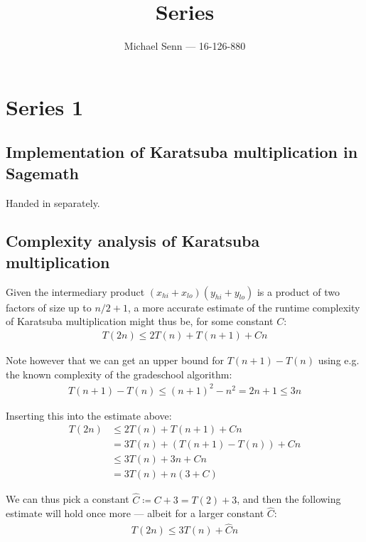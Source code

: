 \documentclass[a4paper]{scrreprt}
\title{Series \series}
\author{Michael Senn \maillink{michael.senn@students.unibe.ch} --- 16-126-880}
\date{\printdate}
\newcommand{\series}{1}
\begin{document}
\maketitle


\setcounter{chapter}{\numexpr \series - 1 \relax}

\chapter{Series \series}

\section{Implementation of Karatsuba multiplication in Sagemath}

Handed in separately.

\section{Complexity analysis of Karatsuba multiplication}

Given the intermediary product $(x_{hi} + x_{lo}) (y_{hi} + y_{lo})$ is a
product of two factors of size up to $n/2 + 1$, a more accurate estimate of the
runtime complexity of Karatsuba multiplication might thus be, for some constant
$C$:
\begin{align*}
		T(2n) \leq 2 T(n) + T(n+1) + Cn
\end{align*}

Note however that we can get an upper bound for $T(n+1) - T(n)$ using e.g. the
known complexity of the gradeschool algorithm:
\begin{align*}
		T(n + 1) - T(n) \leq (n+1)^2 - n^2 = 2n + 1 \leq 3n
\end{align*}

Inserting this into the estimate above:
\begin{align*}
		T(2n) & \leq 2 T(n) + T(n+1) + Cn \\
			  & = 3 T(n) + (T(n+1) - T(n)) + Cn \\
			  & \leq 3 T(n) + 3n + Cn \\
			  & = 3 T(n) + n(3 + C)
\end{align*}

We can thus pick a constant $\hat{C} \coloneqq C + 3 = T(2) + 3$, and then the
following estimate will hold once more --- albeit for a larger constant
$\hat{C}$:
\begin{align*}
		T(2n) \leq 3 T(n) + \hat{C} n
\end{align*}
\end{document}
